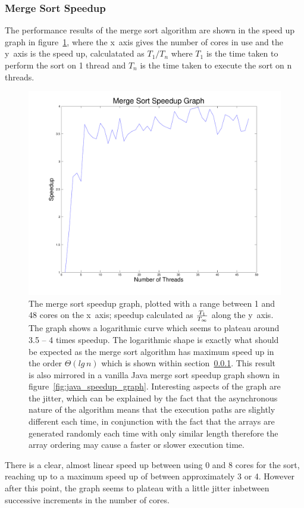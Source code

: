 \documentclass[12pt,twoside,notitlepage]{report}
\begin{document}
\subsubsection{Merge Sort Speedup}
\label{subsec:merge_sort_performance_analysis}
The performance results of the merge sort algorithm are shown in the speed up graph in figure~\ref{fig:msort_speedup_graph}, where the x~axis gives the number of cores in use and the y~axis is the speed up, calculatated as
$T_1 / T_n$ where $T_1$ is the time taken to perform the sort on 1 thread and $T_n$ is the time taken to execute the sort on n threads.
\begin{figure}[h!]
\includegraphics[width=\linewidth]{msort_speedup_graph}
\caption{The merge sort speedup graph, plotted with a range between 1 and 48 cores on the x~axis; speedup calculated as $T_{1} \over T_{\infty}$ along the y~axis. The graph shows a logarithmic curve which seems to plateau around 3.5
-- 4 times speedup. The logarithmic shape is exactly what should be expected as the merge sort algorithm has maximum speed up in the order $\Theta(lg\,n)$ which is shown within section~\ref{subsec:merge_sort_performance_analysis}.
This result is also mirrored in a vanilla Java merge sort speedup graph shown in figure~\ref{fig:java_speedup_graph}. Interesting aspects of the graph are the jitter, which can be explained by the fact that the asynchronous nature of
the algorithm means that the execution paths are slightly different each time, in conjunction with the fact that the arrays are generated randomly each time with only similar length therefore the array ordering may cause a faster or
slower execution time.}
\label{fig:msort_speedup_graph}
\end{figure}
There is a clear, almost linear speed up between using 0 and 8 cores for the sort, reaching up to a maximum speed up of between approximately 3 or 4. However after this point, the graph seems to plateau with a little jitter inbetween
successive increments in the number of cores.
\end{document}
